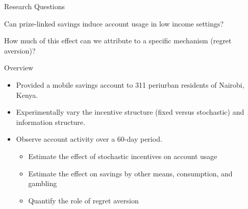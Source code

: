 \documentclass[aspectratio=169]{beamer}
\newenvironment{wideitemize}{\itemize\addtolength{\itemsep}{10pt}}{\enditemize}
\newenvironment{wideenumerate}{\enumerate\addtolength{\itemsep}{10pt}}{\endenumerate}
\begin{document}





\begin{frame}{Research Questions}

	\begin{wideenumerate}

		\item Can prize-linked savings induce account usage in low income settings?
		\item How much of this effect can we attribute to a specific mechanism (regret aversion)?


	\end{wideenumerate}

\end{frame}

\begin{frame}{Overview}

	\begin{itemize}

		\item Provided a mobile savings account to 311 periurban residents of Nairobi, Kenya.
		\item Experimentally vary the incentive structure (fixed versus stochastic) and information structure.
		\item Observe account activity over a 60-day period.

		\begin{itemize}
			\item Estimate the effect of stochastic incentives on account usage
			\item Estimate the effect on savings by other means, consumption, and gambling
			\item Quantify the role of regret aversion
		\end{itemize}

	\end{itemize}

\end{frame}
\end{document}
